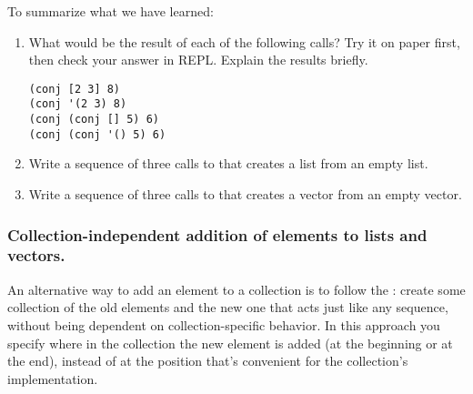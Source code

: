 To summarize what we have learned: 

\begin{exercise}\label{ex:conj}
\begin{enumerate}
\item What would be the result of each of the following calls? Try it on paper first, then check your answer in REPL. Explain the results briefly. 
\begin{framed}
\begin{verbatim}
(conj [2 3] 8)
(conj '(2 3) 8)
(conj (conj [] 5) 6)
(conj (conj '() 5) 6)
\end{verbatim}
\end{framed}
\item Write a sequence of three calls to  that creates a list  from an empty list. 
\item  Write a sequence of three calls to  that creates a vector \clocode{[3 5 7]} from an empty vector. 
\end{enumerate}
\end{exercise}


\subsubsection{Collection-independent addition of elements to lists and vectors. }\label{subsubsec:add-first-last}
An alternative way to add an element to a collection is to follow the : create some collection of the old elements and the new one that acts just like any sequence, without being dependent on collection-specific behavior. In this approach you specify where in the collection the new element is added (at the beginning or at the end), instead of at the position that's convenient for the collection's implementation. 

